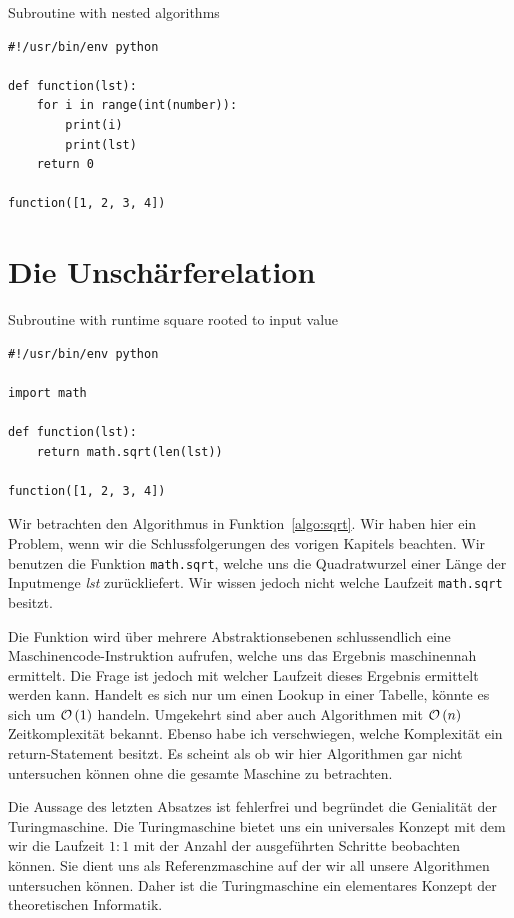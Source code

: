 \begin{algorithm}
\caption{Subroutine with nested algorithms}
\label{algo:nested}
\begin{lstlisting}
#!/usr/bin/env python

def function(lst):
    for i in range(int(number)):
        print(i)
        print(lst)
    return 0

function([1, 2, 3, 4])
\end{lstlisting}
\end{algorithm}
%
\section{Die Unschärferelation}
%
\begin{algorithm}
\caption{Subroutine with runtime square rooted to input value}
\label{algo:sqrt}
\begin{lstlisting}
#!/usr/bin/env python

import math

def function(lst):
    return math.sqrt(len(lst))

function([1, 2, 3, 4])
\end{lstlisting}
\end{algorithm}
%
Wir betrachten den Algorithmus in Funktion~\ref{algo:sqrt}. Wir haben hier ein Problem, wenn wir die Schlussfolgerungen des vorigen Kapitels beachten. Wir benutzen die Funktion \verb=math.sqrt=, welche uns die Quadratwurzel einer Länge der Inputmenge \textit{lst} zurückliefert. Wir wissen jedoch nicht welche Laufzeit \verb=math.sqrt= besitzt.

Die Funktion wird über mehrere Abstraktionsebenen schlussendlich eine Maschinencode-Instruktion aufrufen, welche uns das Ergebnis maschinennah ermittelt. Die Frage ist jedoch mit welcher Laufzeit dieses Ergebnis ermittelt werden kann. Handelt es sich nur um einen Lookup in einer Tabelle, könnte es sich um $\mathcal{O}\left(1\right)$ handeln. Umgekehrt sind aber auch Algorithmen mit $\mathcal{O}\left(n\right)$ Zeitkomplexität bekannt. Ebenso habe ich verschwiegen, welche Komplexität ein return-Statement besitzt. Es scheint als ob wir hier Algorithmen gar nicht untersuchen können ohne die gesamte Maschine zu betrachten.

Die Aussage des letzten Absatzes ist fehlerfrei und begründet die Genialität der Turingmaschine. Die Turingmaschine bietet uns ein universales Konzept mit dem wir die Laufzeit $1:1$ mit der Anzahl der ausgeführten Schritte beobachten können. Sie dient uns als Referenzmaschine auf der wir all unsere Algorithmen untersuchen können. Daher ist die Turingmaschine ein elementares Konzept der theoretischen Informatik.
%

